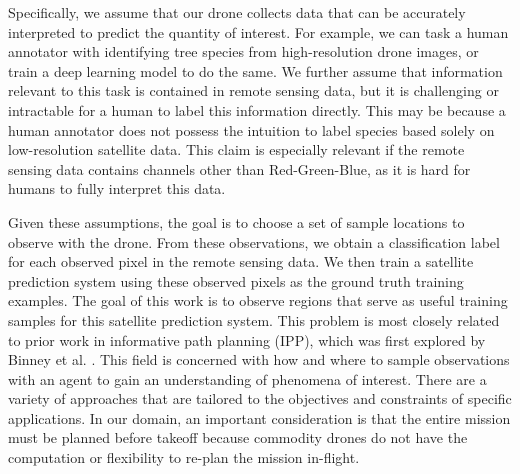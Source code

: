 Specifically, we assume that our drone collects data that can be accurately interpreted to predict the quantity of interest. For example, we can task a human annotator with identifying tree species from high-resolution drone images, or train a deep learning model to do the same. We further assume that information relevant to this task is contained in remote sensing data, but it is challenging or intractable for a human to label this information directly. This may be because a human annotator does not possess the intuition to label species based solely on low-resolution satellite data. This claim is especially relevant if the remote sensing data contains channels other than Red-Green-Blue, as it is hard for humans to fully interpret this data. 

Given these assumptions, the goal is to choose a set of sample locations to observe with the drone. From these observations, we obtain a classification label for each observed pixel in the remote sensing data. We then train a satellite prediction system using these observed pixels as the ground truth training examples. The goal of this work is to observe regions that serve as useful training samples for this satellite prediction system. 
This problem is most closely related to prior work in informative path planning (IPP), which was first explored by Binney et al. \cite{Binney2013OptimizingPhenomena}. This field is concerned with how and where to sample observations with an agent to gain an understanding of phenomena of interest. There are a variety of approaches that are tailored to the objectives and constraints of specific applications. In our domain, an important consideration is that the entire mission must be planned before takeoff because commodity drones do not have the computation or flexibility to re-plan the mission in-flight.

